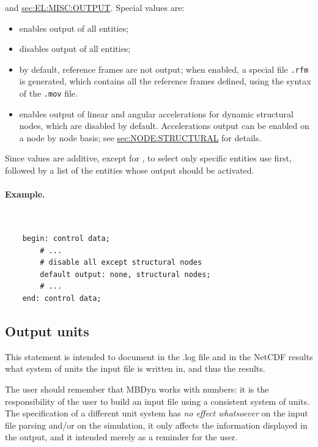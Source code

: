 and 
\hyperref{\kw{elements}}{\kw{elements} (see Section~}{)}{sec:EL:MISC:OUTPUT}.
Special values are:
\begin{itemize}
\item {} enables output of all entities;
\item {} disables output of all entities;
\item {} by default, reference frames are not output;
when enabled, a special file \texttt{.rfm} is generated, which contains
all the reference frames defined, using the syntax of the \texttt{.mov} file.
\item {} enables output of linear and angular accelerations
for dynamic structural nodes, which are disabled by default.
Accelerations output can be enabled on a node by node basis;
see 
\hyperref{\kw{structural node}}{\kw{structural node} (see Section~}{)}{sec:NODE:STRUCTURAL}
for details.
\end{itemize}
Since values are additive, except for , to select 
only specific entities use  first, followed by a list
of the entities whose output should be activated.

\paragraph{Example.} \
\begin{verbatim}
    begin: control data;
        # ...
        # disable all except structural nodes
        default output: none, structural nodes;
        # ...
    end: control data;
\end{verbatim}

\subsection{Output units}
\label{sec:CONTROLDATA:OUTPUTUNITS}
This statement is intended to document in the .log file and in the NetCDF results 
what system of units the input file is written in, and thus the results.

The user should remember that MBDyn works with numbers: it is the responsibility 
of the user to build an input file using a consistent system of units.
The specification of a different unit system has \emph{no effect whatsoever} on the
input file parsing and/or on the simulation, it only affects the information 
displayed in the output, and it intended merely as a reminder for the user.

